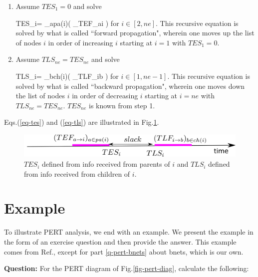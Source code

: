 \begin{enumerate}
\item Assume $TES_1=0$ and solve

\beq
TES_i= \max_{a\in pa(i)}(
_{TEF_{a\rarrow i}}
)
\;
\label{eq-tes}
\eeq
for $i\in [2, ne]$.
This recursive equation is solved
by what is called
``forward propagation",
wherein one 
moves up the list of
nodes $i$ in order 
of increasing 
$i$
starting at $i=1$ with $TES_1=0$.

\item Assume $TLS_{ne}=TES_{ne}$ and solve

\beq
TLS_i= \min_{b\in ch(i)}(
_{TLF_{i\rarrow b}}
)
\;
\label{eq-tls}
\eeq
for $i\in [1, ne-1]$. This recursive
equation is solved
by what is called
``backward propagation",
wherein one 
moves down the list of
nodes $i$ in order 
of decreasing 
$i$
starting at $i=ne$ with $TLS_{ne}=TES_{ne}$.
$TES_{ne}$ is known from step 1.
\end{enumerate}
Eqs.(\ref{eq-tes}) and (\ref{eq-tls})
are illustrated in Fig.\ref{fig-pert-t-interval}.



\begin{figure}[h!]
\centering
\includegraphics[width=6in]{pert/pert.png}
\caption{
$TES_i$ 
defined from info received
from parents of  $i$
and  $TLS_i$
defined from info received 
from children of $i$.} 
\label{fig-pert-t-interval}
\end{figure}

\section{Example}
To illustrate PERT analysis, we end 
with an example. We present the 
example
in the form of an exercise question and then
provide the answer. This example
comes from Ref.\cite{ibook},
except for part \ref{q-pert-bnets} 
about bnets, which is our own.

{\bf Question:}
For the PERT diagram of Fig.\ref{fig-pert-diag},
calculate the following:



